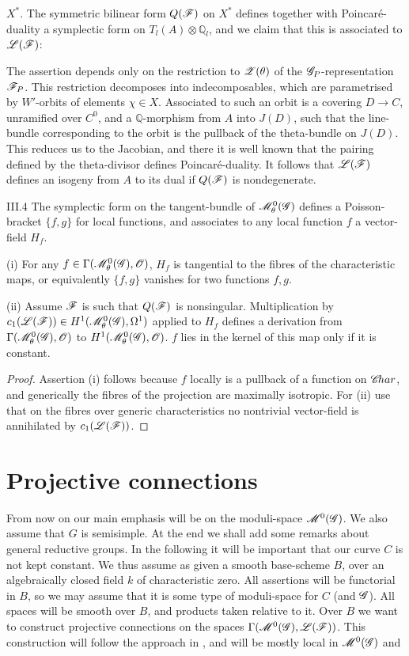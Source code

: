 \documentclass[12pt,english]{smfart}
\theoremstyle{plain} \newtheorem{innerthm}{Theorem} \newtheorem{innerlem}{Lemma} \newtheorem{innerprop}{Proposition} \newtheorem{innercor}{Corollary} \theoremstyle{definition} \newtheorem{innerdefn}{Definition} \newtheorem{innerconstr}{Construction} \theoremstyle{remark} \newtheorem*{remark}{Remark} \newtheorem*{remarks}{Remarks} \newtheorem*{applications}{Applications}
\begin{document}

$X^*$. The symmetric bilinear form $Q(\mathscr{F})$ on $X^*$ defines together with Poincar\'e-duality a symplectic form on $T_l(A)\otimes\mathbb{Q}_l$, and we claim that this is associated to $\mathscr{L}(\mathscr{F})$:

The assertion depends only on the restriction to $\mathscr{Z}(\theta)$ of the $\mathscr{G}_P$-representation $\mathscr{F}_P$. This restriction decomposes into indecomposables, which are parametrised by $W'$-orbits of elements $\chi\in X$. Associated to such an orbit is a covering $D\to C$, unramified over $C^0$, and a $\mathbb{Q}$-morphism from $A$ into $J(D)$, such that the line-bundle corresponding to the orbit is the pullback of the theta-bundle on $J(D)$. This reduces us to the Jacobian, and there it is well known that the pairing defined by the theta-divisor defines Poincar\'e-duality. It follows that $\mathscr{L}(\mathscr{F})$ defines an isogeny from $A$ to its dual if $Q(\mathscr{F})$ is nondegenerate.

\begin{corollary}{III.4}\label{cor:III.4}
The symplectic form on the tangent-bundle of $\mathscr{M}^0_\theta(\mathscr{G})$ defines a Poisson-bracket $\{f,g\}$ for local functions, and associates to any local function $f$ a vector-field $H_f$.

(i) For any $f\in\Gamma(\mathscr{M}^0_\theta(\mathscr{G}),\mathscr{O})$, $H_f$ is tangential to the fibres of the characteristic maps, or equivalently $\{f,g\}$ vanishes for two functions $f,g$.

(ii) Assume $\mathscr{F}$ is such that $Q(\mathscr{F})$ is nonsingular. Multiplication by $c_1(\mathscr{L}(\mathscr{F}))\in H^1(\mathscr{M}^0_\theta(\mathscr{G}),\Omega^1)$ applied to $H_f$ defines a derivation from $\Gamma(\mathscr{M}^0_\theta(\mathscr{G}),\mathscr{O})$ to $H^1(\mathscr{M}^0_\theta(\mathscr{G}),\mathscr{O})$. $f$ lies in the kernel of this map only if it is constant.
\end{corollary}

\begin{proof}
Assertion (i) follows because $f$ locally is a pullback of a function on $\mathscr{C}\!har$, and generically the fibres of the projection are maximally isotropic. For (ii) use that on the fibres over generic characteristics no nontrivial vector-field is annihilated by $c_1(\mathscr{L}(\mathscr{F}))$.
\end{proof}

\section{Projective connections}\label{sec:IV}

From now on our main emphasis will be on the moduli-space $\mathscr{M}^0(\mathscr{G})$. We also assume that $G$ is semisimple. At the end we shall add some remarks about general reductive groups. In the following it will be important that our curve $C$ is not kept constant. We thus assume as given a smooth base-scheme $B$, over an algebraically closed field $k$ of characteristic zero. All assertions will be functorial in $B$, so we may assume that it is some type of moduli-space for $C$ (and $\mathscr{G}$). All spaces will be smooth over $B$, and products taken relative to it. Over $B$ we want to construct projective connections on the spaces $\Gamma(\mathscr{M}^0(\mathscr{G}),\mathscr{L}(\mathscr{F}))$. This construction will follow the approach in \cite{APW}, and will be mostly local in $\mathscr{M}^0(\mathscr{G})$ and
\end{document}
